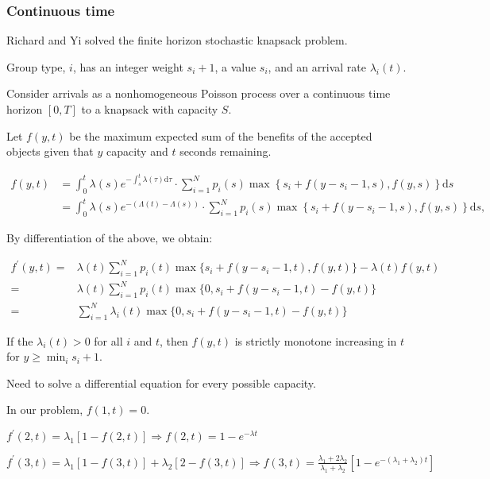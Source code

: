 \subsubsection*{Continuous time}
Richard and Yi solved the finite horizon stochastic knapsack problem. \cite{van2000finite}

Group type, $i$, has an integer weight $s_i +1$, a value $s_i$, and an arrival rate $\lambda_{i}(t)$.

Consider arrivals as a nonhomogeneous Poisson process over a continuous time horizon $[0, T]$ to a knapsack with capacity $S$.

Let $f(y, t)$ be the maximum expected sum of the benefits of the accepted objects given that $y$ capacity and $t$ seconds remaining.

$$
\begin{aligned}
f(y, t) &= \int_0^t \lambda(s) e^{-\int_s^t \lambda(\tau) \mathrm{d} \tau} \cdot \sum_{i=1}^N p_i(s) \max \left\{s_i+f\left(y-s_i -1, s\right), f(y, s)\right\} \mathrm{d} s \\
 &= \int_0^t \lambda(s) e^{-(\Lambda(t)-\Lambda(s))} \cdot \sum_{i=1}^N p_i(s) \max \left\{s_i+f\left(y-s_i-1, s\right), f(y, s)\right\} \mathrm{d} s,
\end{aligned}
$$

By differentiation of the above, we obtain:

$$
\begin{aligned}
f^{\prime}(y, t)= & \lambda(t) \sum_{i=1}^N p_i(t) \max \{s_i+f\left(y-s_i-1, t\right),f(y, t)\}-\lambda(t) f(y, t) \\
= & \lambda(t) \sum_{i=1}^N p_i(t) \max \{0, s_i+f\left(y-s_i-1, t\right) -f(y, t)\} \\
= & \sum_{i=1}^{N} \lambda_{i}(t) \max \{0, s_i+f\left(y-s_i -1, t\right) -f(y, t)\}
\end{aligned}
$$

If the $\lambda_{i}(t) > 0$ for all $i$ and $t$, then $f(y,t)$ is strictly monotone increasing in $t$ for $y \geq \min_{i} s_i +1$.

Need to solve a differential equation for every possible capacity.

In our problem, $f(1,t) = 0$.

$f^{\prime}(2, t) = \lambda_1 [1- f(2,t)] \Rightarrow f(2,t) = 1- e^{-\lambda t}$

$f^{\prime}(3, t) = \lambda_1 [1- f(3,t)] + \lambda_2 [2 - f(3,t)] \Rightarrow f(3,t) = \frac{\lambda_1 + 2 \lambda_2}{\lambda_1 + \lambda_2} [1- e^{-(\lambda_1 + \lambda_2) t}]$


